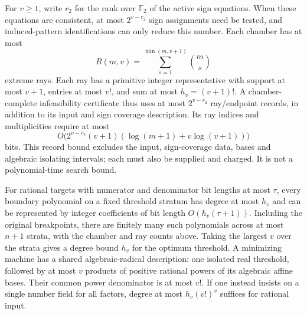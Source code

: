 \begin{proposition}
\label{prop:complexity50}
For $v\ge1$, write $r_2$ for the rank over $\mathbb F_2$ of the active
sign equations. When these equations are consistent, at most
$2^{v-r_2}$ sign assignments need be tested, and induced-pattern
identifications can only reduce this number. Each chamber has at most
\begin{equation}\label{eq:rays50}
 R(m,v)=\sum_{s=1}^{\min(m,v+1)}\binom{m}{s}
\end{equation}
extreme rays. Each ray has a primitive integer representative with
support at most $v+1$, entries at most $v!$, and sum at most
$h_v=(v+1)!$. A chamber-complete infeasibility certificate thus uses at
most $2^{v-r_2}$ ray/endpoint records, in addition to its input and sign
coverage description. Its ray indices and multiplicities require at
most
\[
 O\bigl(2^{v-r_2}(v+1)(\log(m+1)+v\log(v+1))\bigr)
\]
bits. This record bound excludes the input, sign-coverage data, bases and algebraic isolating intervals; each must also be supplied and charged. It is not a polynomial-time search bound.

For rational targets with numerator and denominator bit lengths at
most $\tau$, every boundary polynomial on a fixed threshold stratum
has degree at most $h_v$ and can be represented by integer coefficients
of bit length $O(h_v(\tau+1))$. Including the original breakpoints,
there are finitely many such polynomials across at most $n+1$ strata,
with the chamber and ray counts above. Taking the largest $v$ over
the strata gives a degree bound $h_v$ for the optimum threshold.
A minimizing machine has a shared algebraic-radical description:
one isolated real threshold, followed by at most $v$ products of
positive rational powers of its algebraic affine bases. Their common
power denominator is at most $v!$. If one instead insists on a single
number field for all factors, degree at most
$h_v(v!)^v$ suffices for rational input.
\end{proposition}
